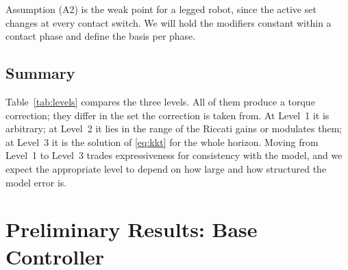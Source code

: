 \documentclass[conference]{IEEEtran}
\begin{document}
Assumption (A2) is the weak point for a legged robot, since the active set changes at every contact switch.
We will hold the modifiers constant within a contact phase and define the basis per phase.

\subsection{Summary}
Table~\ref{tab:levels} compares the three levels.
All of them produce a torque correction; they differ in the set the correction is taken from.
At Level~1 it is arbitrary; at Level~2 it lies in the range of the Riccati gains or modulates them; at Level~3 it is the solution of \eqref{eq:kkt} for the whole horizon.
Moving from Level~1 to Level~3 trades expressiveness for consistency with the model, and we expect the appropriate level to depend on how large and how structured the model error is.

\begin{table}[t]
\caption{The three residual injection points}
\label{tab:levels}
\centering
\setlength{\tabcolsep}{3.5pt}
\end{table}

\section{Preliminary Results: Base Controller}
\label{sec:results}
\end{document}
